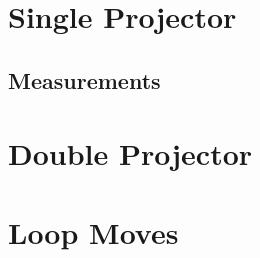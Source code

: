 \section{Single Projector}
\subsection{Measurements}
\section{Double Projector}
\section{Loop Moves}

